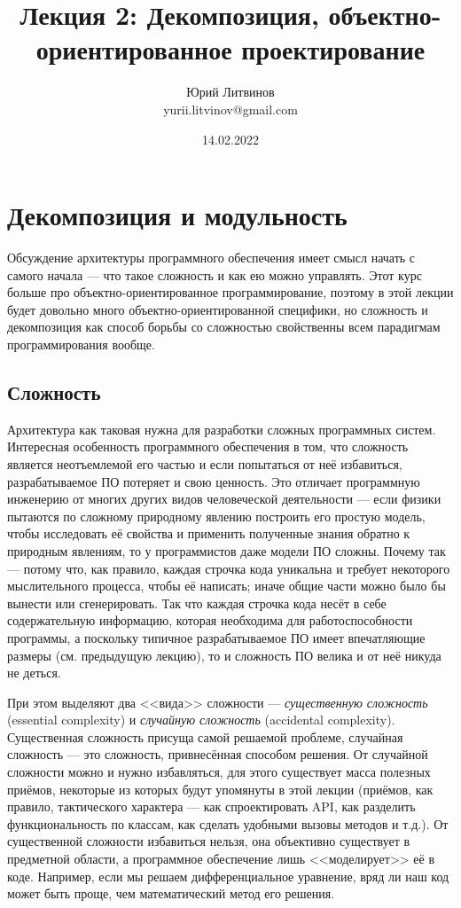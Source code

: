 \documentclass[a5paper]{article}
\title{Лекция 2: Декомпозиция, объектно-ориентированное проектирование}
\author{Юрий Литвинов\\\small{yurii.litvinov@gmail.com}}
\date{14.02.2022}
\begin{document}
\maketitle
\thispagestyle{empty}

\section{Декомпозиция и модульность}


Обсуждение архитектуры программного обеспечения имеет смысл начать с самого начала --- что такое сложность и как ею можно управлять. Этот курс больше про объектно-ориентированное программирование, поэтому в этой лекции будет довольно много объектно-ориентированной специфики, но сложность и декомпозиция как способ борьбы со сложностью свойственны всем парадигмам программирования вообще.

\subsection{Сложность}

Архитектура как таковая нужна для разработки сложных программных систем. Интересная особенность программного обеспечения в том, что сложность является неотъемлемой его частью и если попытаться от неё избавиться, разрабатываемое ПО потеряет и свою ценность. Это отличает программную инженерию от многих других видов человеческой деятельности --- если физики пытаются по сложному природному явлению построить его простую модель, чтобы исследовать её свойства и применить полученные знания обратно к природным явлениям, то у программистов даже модели ПО сложны. Почему так --- потому что, как правило, каждая строчка кода уникальна и требует некоторого мыслительного процесса, чтобы её написать; иначе общие части можно было бы вынести или сгенерировать. Так что каждая строчка кода несёт в себе содержательную информацию, которая необходима для работоспособности программы, а поскольку типичное разрабатываемое ПО имеет впечатляющие размеры (см. предыдущую лекцию), то и сложность ПО велика и от неё никуда не деться.

При этом выделяют два <<вида>> сложности --- \textit{существенную сложность} (essential complexity) и \textit{случайную сложность} (accidental complexity). Существенная сложность присуща самой решаемой проблеме, случайная сложность --- это сложность, привнесённая способом решения. От случайной сложности можно и нужно избавляться, для этого существует масса полезных приёмов, некоторые из которых будут упомянуты в этой лекции (приёмов, как правило, тактического характера --- как спроектировать API, как разделить функциональность по классам, как сделать удобными вызовы методов и т.д.). От существенной сложности избавиться нельзя, она объективно существует в предметной области, а программное обеспечение лишь <<моделирует>> её в коде. Например, если мы решаем дифференциальное уравнение, вряд ли наш код может быть проще, чем математический метод его решения.
\end{document}
